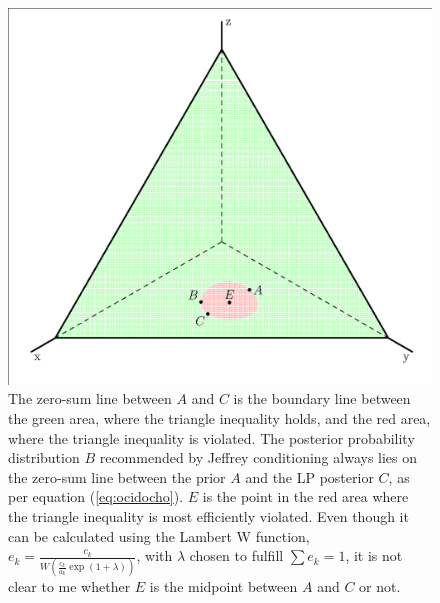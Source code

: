 \documentclass[12pt]{article}
\begin{document}
\begin{figure}[ht]
    \begin{minipage}[h]{.7\linewidth}
      \includegraphics[width=\textwidth]{dreieck.eps}
      \caption{The zero-sum line between $A$ and $C$ is the boundary
        line between the green area, where the triangle inequality
        holds, and the red area, where the triangle inequality is
        violated. The posterior probability distribution $B$
        recommended by Jeffrey conditioning always lies on the
        zero-sum line between the prior $A$ and the LP posterior $C$,
        as per equation (\ref{eq:ocidocho}). $E$ is the point in the
        red area where the triangle inequality is most efficiently
        violated. Even though it can be calculated using the Lambert W
        function,
        $e_{k}=\frac{c_{k}}{W\left(\frac{c_{k}}{a_{k}}\exp(1+\lambda)\right)}$,
        with $\lambda$ chosen to fulfill $\sum{}e_{k}=1$, it is not
        clear to me whether $E$ is the midpoint between $A$ and $C$ or
        not.}
      \label{fig:eugoohue}
\end{minipage}
\end{figure}
\end{document}
